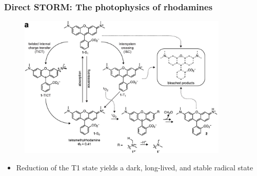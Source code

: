\documentclass{beamer}					%
\begin{document}
\begin{frame}
\frametitle{Direct STORM: The photophysics of rhodamines}

\begin{figure}
\includegraphics[width=10cm]{Rhodamines.png}
\end{figure}
\begin{itemize}
\item  Reduction of the T1 state yields a dark, long-lived, and stable radical state
\end{itemize}
\end{frame}
\end{document}
